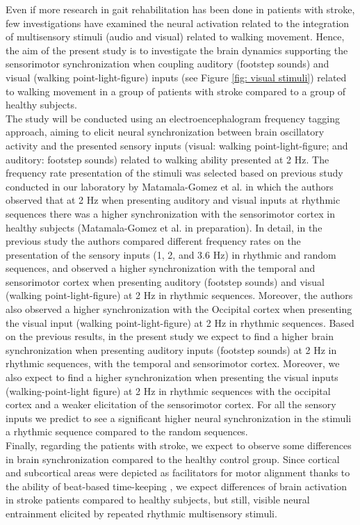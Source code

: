 Even if more research in gait rehabilitation has been done in patients with stroke, few investigations have examined the neural activation related to the integration of multisensory stimuli (audio and visual) related to walking movement. Hence, the aim of the present study is to investigate the brain dynamics supporting the sensorimotor synchronization when coupling auditory (footstep sounds) and visual (walking point-light-figure) inputs (see Figure \ref{fig: visual stimuli}) related to walking movement in a group of patients with stroke compared to a group of healthy subjects. \\
The study will be conducted using an electroencephalogram frequency tagging approach, aiming to elicit neural synchronization between brain oscillatory activity and the presented sensory inputs (visual: walking point-light-figure; and auditory: footstep sounds) related to walking ability presented at 2 Hz. The frequency rate presentation of the stimuli was selected based on previous study conducted in our laboratory by Matamala-Gomez et al. in which the authors observed that at 2 Hz when presenting auditory and visual inputs at rhythmic sequences there was a higher synchronization with the sensorimotor cortex in healthy subjects (Matamala-Gomez et al. in preparation). In detail, in the previous study the authors compared different frequency rates on the presentation of the sensory inputs (1, 2, and 3.6 Hz) in rhythmic and random sequences, and observed a higher synchronization with the temporal and sensorimotor cortex when presenting auditory (footstep sounds) and visual (walking point-light-figure) at 2 Hz in rhythmic sequences. Moreover, the authors also observed a higher synchronization with the Occipital cortex when presenting the visual input (walking point-light-figure) at 2 Hz in rhythmic sequences. Based on the previous results, in the present study we expect to find a higher brain synchronization when presenting auditory inputs (footstep sounds) at 2 Hz in rhythmic sequences, with the temporal and sensorimotor cortex. Moreover, we also expect to find a higher synchronization when presenting the visual inputs (walking-point-light figure) at 2 Hz in rhythmic sequences with the occipital cortex and a weaker elicitation of the sensorimotor cortex. For all the sensory inputs we predict to see a significant higher neural synchronization in the stimuli a rhythmic sequence compared to the random sequences. \\
Finally, regarding the patients with stroke, we expect to observe some differences in brain synchronization compared to the healthy control group. Since cortical and subcortical areas were depicted as facilitators for motor alignment thanks to the ability of beat-based time-keeping \parencite{Cannon_2021}, we expect differences of brain activation in stroke patients compared to healthy subjects, but still, visible neural entrainment elicited by repeated rhythmic multisensory stimuli.

